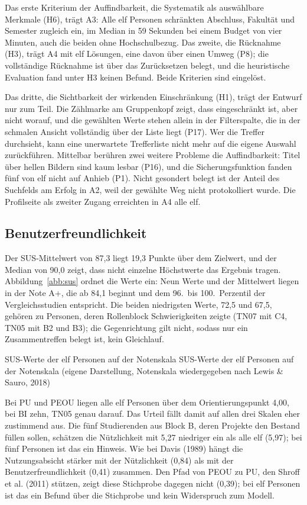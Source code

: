Das erste Kriterium der Auffindbarkeit, die Systematik als auswählbare Merkmale (H6), trägt A3: Alle elf Personen schränkten Abschluss, Fakultät und Semester zugleich ein, im Median in 59 Sekunden bei einem Budget von vier Minuten, auch die beiden ohne Hochschulbezug. Das zweite, die Rücknahme (H3), trägt A4 mit elf Lösungen, eine davon über einen Umweg (P8); die vollständige Rücknahme ist über das Zurücksetzen belegt, und die heuristische Evaluation fand unter H3 keinen Befund. Beide Kriterien sind eingelöst.

Das dritte, die Sichtbarkeit der wirkenden Einschränkung (H1), trägt der Entwurf nur zum Teil. Die Zählmarke am Gruppenkopf zeigt, dass eingeschränkt ist, aber nicht worauf, und die gewählten Werte stehen allein in der Filterspalte, die in der schmalen Ansicht vollständig über der Liste liegt (P17). Wer die Treffer durchsieht, kann eine unerwartete Trefferliste nicht mehr auf die eigene Auswahl zurückführen. Mittelbar berühren zwei weitere Probleme die Auffindbarkeit: Titel über hellen Bildern sind kaum lesbar (P16), und die Sicherungsfunktion fanden fünf von elf nicht auf Anhieb (P1). Nicht gesondert belegt ist der Anteil des Suchfelds am Erfolg in A2, weil der gewählte Weg nicht protokolliert wurde. Die Profilseite als zweiter Zugang erreichten in A4 alle elf.

\subsection{Benutzerfreundlichkeit}
\label{subsec:benutzerfreundlichkeit}

Der SUS-Mittelwert von 87,3 liegt 19,3 Punkte über dem Zielwert, und der Median von 90,0 zeigt, dass nicht einzelne Höchstwerte das Ergebnis tragen. Abbildung~\ref{abb:sus} ordnet die Werte ein: Neun Werte und der Mittelwert liegen in der Note A+, die ab 84,1 beginnt und dem 96.\ bis 100.\ Perzentil der Vergleichsstudien entspricht. Die beiden niedrigsten Werte, 72,5 und 67,5, gehören zu Personen, deren Rollenblock Schwierigkeiten zeigte (TN07 mit C4, TN05 mit B2 und B3); die Gegenrichtung gilt nicht, sodass nur ein Zusammentreffen belegt ist, kein Gleichlauf.

%
{SUS-Werte der elf Personen auf der Notenskala}%
{SUS-Werte der elf Personen auf der Notenskala (eigene Darstellung, Notenskala wiedergegeben nach Lewis \& Sauro, 2018)}

Bei PU und PEOU liegen alle elf Personen über dem Orientierungspunkt 4,00, bei BI zehn, TN05 genau darauf. Das Urteil fällt damit auf allen drei Skalen eher zustimmend aus. Die fünf Studierenden aus Block B, deren Projekte den Bestand füllen sollen, schätzen die Nützlichkeit mit 5,27 niedriger ein als alle elf (5,97); bei fünf Personen ist das ein Hinweis. Wie bei Davis (1989) hängt die Nutzungsabsicht stärker mit der Nützlichkeit (0,84) als mit der Benutzerfreundlichkeit (0,41) zusammen. Den Pfad von PEOU zu PU, den Shroff et al. (2011) stützen, zeigt diese Stichprobe dagegen nicht (0,39); bei elf Personen ist das ein Befund über die Stichprobe und kein Widerspruch zum Modell.

